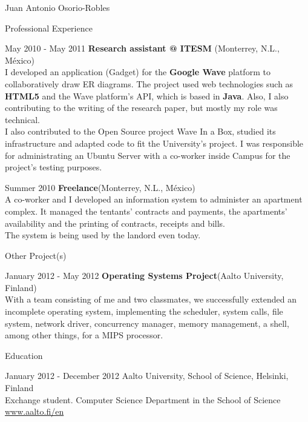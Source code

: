 \documentclass[english,11pt,letterpaper]{article}
\begin{document}
\begin{cv}{Juan Antonio Osorio-Robles}
\begin{cvlist}{Professional Experience}
		\item [May 2010 - May 2011]
            \textbf{Research assistant @ ITESM} (Monterrey, N.L., M\'{e}xico)\\
            I developed an application (Gadget) for the \textbf{Google Wave}
            platform to collaboratively draw ER diagrams. The project used web
            technologies such as \textbf{HTML5} and the Wave platform's API,
            which is based in \textbf{Java}. Also, I also contributing to the
            writing of the research paper, but mostly my role was technical.\\

            I also contributed to the Open Source project Wave In a Box,
            studied its infrastructure and adapted code to fit the
            University's project. I was responsible for administrating an
            Ubuntu Server with a co-worker inside Campus for the project's
            testing purposes.

		\item [Summer 2010]
            \textbf{Freelance}(Monterrey, N.L., M\'{e}xico)\\
			A co-worker and I developed an information system to administer an
            apartment complex. It managed the tentants' contracts and payments,
            the apartments' availability and the printing of contracts,
            receipts and bills.\\

            The system is being used by the landord even today.

	\end{cvlist}

    \begin{cvlist}{Other Project(s)}
		\item [January 2012 - May 2012]
            \textbf{Operating Systems Project}(Aalto University, Finland)\\
            With a team consisting of me and two classmates, we successfully
            extended an incomplete operating system, implementing the scheduler,
            system calls, file system, network driver, concurrency manager,
            memory management, a shell, among other things, for a MIPS
            processor.
	\end{cvlist}

	\begin{cvlist}{Education}
		\item [January 2012 - December 2012]
			Aalto University, School of Science, Helsinki, Finland\\
			Exchange student. Computer Science Department in the School of
            Science\\
			\href{www.aalto.fi/en}{www.aalto.fi/en}


\end{cvlist}
\end{cv}
\end{document}
